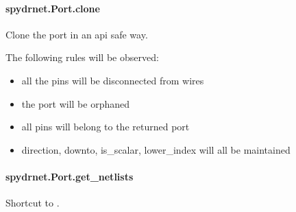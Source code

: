 \documentclass[letterpaper,10pt,english,openany,oneside]{sphinxmanual}
\begin{document}
\paragraph{spydrnet.Port.clone}
\label{\detokenize{reference/classes/generated/spydrnet.Port.clone:spydrnet-port-clone}}\label{\detokenize{reference/classes/generated/spydrnet.Port.clone::doc}}

\begin{fulllineitems}
\label{\detokenize{reference/classes/generated/spydrnet.Port.clone:spydrnet.Port.clone}}
Clone the port in an api safe way.

The following rules will be observed:
\begin{itemize}
\item {} 
all the pins will be disconnected from wires

\item {} 
the port will be orphaned

\item {} 
all pins will belong to the returned port

\item {} 
direction, downto, is\_scalar, lower\_index will all be maintained

\end{itemize}

\end{fulllineitems}



\paragraph{spydrnet.Port.get\_netlists}
\label{\detokenize{reference/classes/generated/spydrnet.Port.get_netlists:spydrnet-port-get-netlists}}\label{\detokenize{reference/classes/generated/spydrnet.Port.get_netlists::doc}}

\begin{fulllineitems}
\label{\detokenize{reference/classes/generated/spydrnet.Port.get_netlists:spydrnet.Port.get_netlists}}
Shortcut to {\hyperref[\detokenize{reference/classes/generated/spydrnet.get_netlists:spydrnet.get_netlists}]{}}.

\end{fulllineitems}
\end{document}
